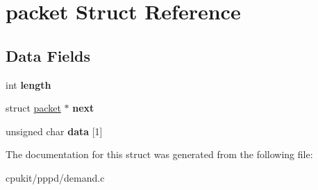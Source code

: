 \hypertarget{structpacket}{}\section{packet Struct Reference}
\label{structpacket}
\subsection*{Data Fields}
\begin{DoxyCompactItemize}
\item 
\mbox{\label{structpacket_a146f8dec4029aa113a1bd6996a83fadb}} 
int {\bfseries length}
\item 
\mbox{\label{structpacket_a4f3c40d14afa3452e4f47a399541f8ce}} 
struct \mbox{\hyperlink{structpacket}{packet}} $\ast$ {\bfseries next}
\item 
\mbox{\label{structpacket_ab3d17a80799865c3af12fe93342ae946}} 
unsigned char {\bfseries data} \mbox{[}1\mbox{]}
\end{DoxyCompactItemize}


The documentation for this struct was generated from the following file\+:\begin{DoxyCompactItemize}
\item 
cpukit/pppd/demand.\+c\end{DoxyCompactItemize}
